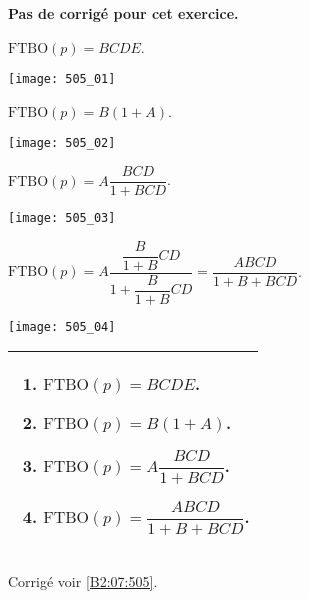 \normaltrue \difficilefalse \tdifficilefalse
\correctionfalse


\setcounter{question}{0}

\ifcorrection
\else
\textbf{Pas de corrigé pour cet exercice.}
\fi


\ifprof 
$\text{FTBO}(p) = BCDE$.
\else
\begin{center}
\texttt{[image: 505\_01]}
\end{center}
\fi
 
\ifprof 
$\text{FTBO}(p) = B\left(1+A\right)$.
\else
\begin{center}
\texttt{[image: 505\_02]}
\end{center}
\fi

\ifprof 
$\text{FTBO}(p) = A \dfrac{BCD}{1+BCD}$.
\else
\begin{center}
\texttt{[image: 505\_03]}
\end{center}
\fi

\ifprof 
$\text{FTBO}(p) = A \dfrac{\dfrac{B}{1+B}CD}{1+\dfrac{B}{1+B}CD} = \dfrac{ABCD}{1+B+BCD}$.
\else
\begin{center}
\texttt{[image: 505\_04]}
\end{center}
\fi





 

\ifprof
\else
\footnotesize
\noindent
\begin{tabular}{|p{.95\linewidth}|}
\hline
\begin{enumerate}
\item $\text{FTBO}(p) = BCDE$.
\item $\text{FTBO}(p) = B\left(1+A\right)$.
\item $\text{FTBO}(p) = A \dfrac{BCD}{1+BCD}$.
\item $\text{FTBO}(p) = \dfrac{ABCD}{1+B+BCD}$.
\end{enumerate} \\ \hline
\end{tabular}
\normalsize

\begin{flushright}
\footnotesize{Corrigé  voir \ref{B2:07:505}.}
\end{flushright}%
\fi